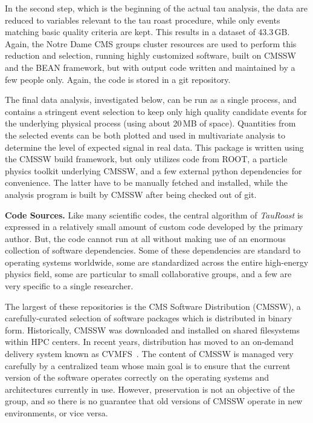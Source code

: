 \documentclass{acm_proc_article-sp}
\begin{document}
In the second step, which is the beginning of the actual tau analysis,
the data are reduced to variables relevant to the tau roast procedure, while
only events matching basic quality criteria are kept.  This results in
a dataset of 43.3$\,$GB.  Again, the Notre Dame CMS groups cluster
resources are used to perform this reduction and selection,
running highly customized software,
built on CMSSW and the BEAN framework,
but with output code written and maintained by a few people only.
Again, the code is stored in a git repository.

The final data analysis, investigated below, can be run as a single
process, and contains a stringent event selection to keep only high
quality candidate events for the underlying physical process (using
about 20$\,$MB of space).  Quantities from the selected events can be
both plotted and used in multivariate analysis to determine the level
of expected signal in real data.
This package is written using the CMSSW build framework,
but only utilizes code from ROOT,
a particle physics toolkit underlying CMSSW,
and a few external python dependencies for convenience.
The latter have to be manually fetched and installed,
while the analysis program is built by CMSSW after being checked out of git.

{\bf Code Sources.} Like many scientific codes, the central algorithm
of \emph{TauRoast} is expressed in a relatively small amount of
custom code developed by the primary author.  But, the code cannot
run at all without making use of an enormous collection of software
dependencies.  Some of these dependencies are standard to operating
systems worldwide, some are standardized across the entire high-energy
physics field, some are particular to small collaborative groups,
and a few are very specific to a single researcher.

The largest of these repositories is the CMS Software Distribution (CMSSW),
a carefully-curated selection of software packages which is distributed
in binary form.  Historically, CMSSW was downloaded and installed on shared
filesystems within HPC centers.  In recent years, distribution has moved to
an on-demand delivery system known as CVMFS~\cite{blomer2011cernvm}.  The content
of CMSSW is managed very carefully by a centralized team whose main goal
is to ensure that the current version of the software operates correctly
on the operating systems and architectures currently in use.  However,
preservation is not an objective of the group, and so there is
no guarantee that old versions of CMSSW operate in new environments,
or vice versa. 
\end{document}
